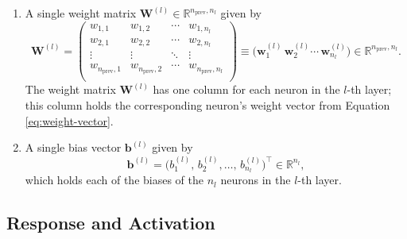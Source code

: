 \documentclass[11pt, a4paper]{article}
\renewcommand{\vec}[1]{\bm{#1}}
\newcommand{\mat}[1]{\mathbf{#1}}
\newcommand{\W}{\mat{W}}
\newcommand{\w}{\vec{w}}
\renewcommand{\b}{\vec{b}}
\begin{document}
\begin{enumerate}

    \item A single weight matrix $ \W^{(l)} \in \mathbb{R}^{n_{\text{prev}}, n_{l}} $ given by
    \begin{equation}
        \W^{(l)} =
        \begin{pmatrix}
            w_{1, 1} & w_{1, 2} & \cdots & w_{1, n_{l}}\\
            w_{2, 1} & w_{2, 2} & \cdots & w_{2, n_{l}}\\
            \vdots & \vdots & \ddots & \vdots\\
            w_{n_{\text{prev}}, 1} & w_{n_{\text{prev}}, 2} & \cdots & w_{n_{\text{prev}}, n_{l}}\\
        \end{pmatrix}
        \equiv \Big( \w_{1}^{(l)} \, \w_{2}^{(l)} \cdots \, \w_{n_{l}}^{(l)} \Big) \in \mathbb{R}^{n_{\text{prev}}, n_{l}}. \label{eq:weight-matrix}
    \end{equation}
    The weight matrix $ \W^{(l)} $ has one column for each neuron in the $ l $-th layer; this column holds the corresponding neuron's weight vector from Equation \ref{eq:weight-vector}.

    \item A single bias vector $ \b^{(l)} $ given by
    \begin{equation}
        \b^{(l)} = \Big( b_{1}^{(l)}, \, b_{2}^{(l)}, \ldots, \, b_{n_{l}}^{(l)} \Big)^{\top} \in \mathbb{R}^{n_{l}}, \label{eq:bias-vector}
    \end{equation}
    which holds each of the biases of the $ n_{l} $ neurons in the $ l $-th layer.


\end{enumerate}


\subsection{Response and Activation} \label{ss:response-activation}
\end{document}
